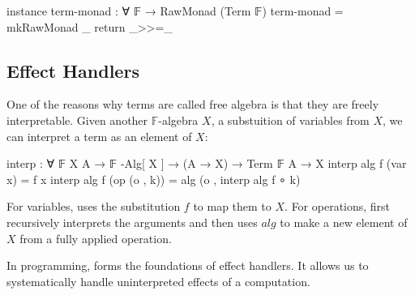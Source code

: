 \begin{code}[hide]
instance
  term-monad : ∀ {𝔽} → RawMonad (Term 𝔽)
  term-monad = mkRawMonad _ return _>>=_
\end{code}

\subsection{Effect Handlers}

One of the reasons why terms are called free algebra is that they are freely interpretable.
%
Given another $\mathbb{F}$-algebra $X$, a substuition of variables from $X$, we can interpret a term as an element of $X$:
%
\begin{center}\begin{code}
interp : ∀ {𝔽} {X A} → 𝔽 -Alg[ X ] → (A → X) → Term 𝔽 A → X
interp alg f (var x)       = f x
interp alg f (op (o , k))  = alg (o , interp alg f ∘ k)
\end{code}\end{center}
%
For variables,  uses the substitution $f$ to map them to $X$.
%
For operations,  first recursively interprets the arguments and then uses ${alg}$ to make a new element of $X$ from a fully applied operation.

In programming,  forms the foundations of effect handlers.
%
It allows us to systematically handle uninterpreted effects of a computation.
